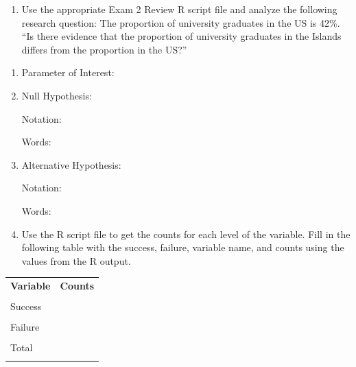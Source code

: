 \documentclass[
]{report}
\providecommand{\tightlist}{%
  \setlength{\itemsep}{0pt}\setlength{\parskip}{0pt}}
\begin{document}
\newpage

\begin{enumerate}
\def\labelenumi{\arabic{enumi}.}
\tightlist
\item
  Use the appropriate Exam 2 Review R script file and analyze the following research question: The proportion of university graduates in the US is 42\%. ``Is there evidence that the proportion of university graduates in the Islands differs from the proportion in the US?''
\end{enumerate}

\begin{enumerate}
\def\labelenumi{\alph{enumi}.}
\item
  Parameter of Interest:
  \vspace{0.3in}
\item
  Null Hypothesis:

  Notation:
  \vspace{0.3in}

  Words:
  \vspace{0.5in}
\item
  Alternative Hypothesis:

  Notation:
  \vspace{0.3in}

  Words:
  \vspace{0.5in}
\item
  Use the R script file to get the counts for each level of the variable. Fill in the following table with the success, failure, variable name, and counts using the values from the R output.
\end{enumerate}

\begingroup
\begin{center}
\setlength{\tabcolsep}{14pt} 
\renewcommand{\arraystretch}{2} 
\begin{tabular}{|p{2in}|p{2in}|}
\hline
 {\textbf{Variable}} & {\textbf{Counts}} \\ 
 & \\ \hline
 Success & \\ 
 &  \\ \hline
 Failure & \\ 
 &  \\ \hline
 Total &  \\ 
 & \\ \hline  
\end{tabular}
\end{center}
\endgroup
\end{document}
